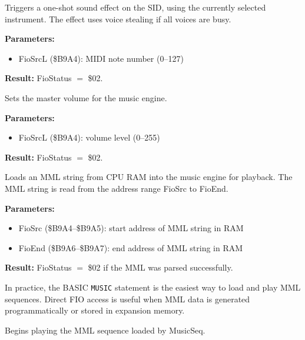 \medskip


Triggers a one-shot sound effect on the SID, using the currently selected
instrument.  The effect uses voice stealing if all voices are busy.

\textbf{Parameters:}
\begin{itemize}
  \item FioSrcL (\$B9A4): MIDI note number (0--127)
\end{itemize}

\textbf{Result:} FioStatus $=$ \$02.

\medskip


Sets the master volume for the music engine.

\textbf{Parameters:}
\begin{itemize}
  \item FioSrcL (\$B9A4): volume level (0--255)
\end{itemize}

\textbf{Result:} FioStatus $=$ \$02.

\medskip


Loads an MML string from CPU RAM into the music engine for playback.  The
MML string is read from the address range FioSrc to FioEnd.

\textbf{Parameters:}
\begin{itemize}
  \item FioSrc (\$B9A4--\$B9A5): start address of MML string in RAM
  \item FioEnd (\$B9A6--\$B9A7): end address of MML string in RAM
\end{itemize}

\textbf{Result:} FioStatus $=$ \$02 if the MML was parsed successfully.

\begin{notebox}
In practice, the BASIC \texttt{MUSIC} statement is the easiest way to load
and play MML sequences.  Direct FIO access is useful when MML data is
generated programmatically or stored in expansion memory.
\end{notebox}

\medskip


Begins playing the MML sequence loaded by MusicSeq.

